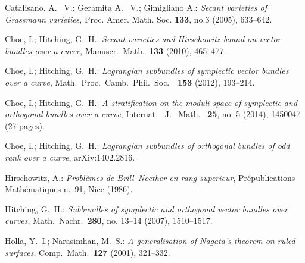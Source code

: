 \documentclass[10pt]{amsart}
\numberwithin{equation}{section}
\begin{document}
\begin{thebibliography}{99}


 Catalisano, A. \ V.; Geramita A. \ V.;  Gimigliano A.: \textsl{Secant varieties of Grassmann varieties}, Proc. Amer. Math. Soc. \textbf{133}, no.3 (2005),  633--642.

 Choe, I.; Hitching, G.\ H.: \textsl{Secant varieties and Hirschowitz bound on vector bundles over a curve}, Manuscr.\ Math.\ \textbf{133} (2010), 465--477.

 Choe, I.; Hitching, G.\ H.: \textsl{Lagrangian subbundles of symplectic vector bundles over a curve}, Math.\ Proc.\ Camb.\ Phil.\ Soc.\ \ \textbf{153} (2012), 193--214.

 Choe, I.; Hitching, G.\ H.: \textsl{A stratification on the moduli space of symplectic and orthogonal bundles over a curve}, Internat. \ J. \ Math. \ \textbf{25}, no. 5 (2014), 1450047 (27 pages). 
 
 Choe, I.; Hitching, G.\ H.: \textsl{Lagrangian subbundles of orthogonal bundles of odd rank over a curve}, arXiv:1402.2816.

 Hirschowitz, A.: \textsl{Probl\`emes de Brill--Noether en rang superieur}, Pr\'epublications Math\'ematiques n.\ 91, Nice (1986).


 Hitching, G.\ H.: \textsl{Subbundles of symplectic and orthogonal vector bundles over curves}, Math.\ Nachr.\ \textbf{280}, no. 13--14 (2007), 1510--1517.


 Holla, Y.\ I.; Narasimhan, M.\ S.: \textsl{A generalisation of Nagata's theorem on ruled surfaces}, Comp.\ Math.\ \textbf{127} (2001), 321--332.




\end{thebibliography}
\end{document}
